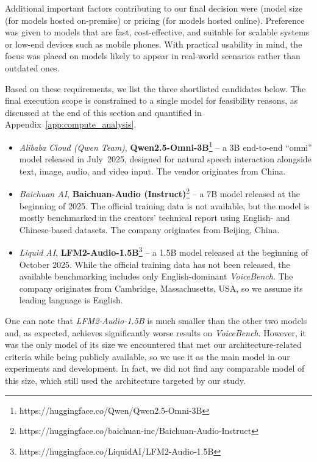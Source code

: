 Additional important factors contributing to our final decision were (model size (for models hosted on-premise) or pricing (for models hosted online). Preference was given to models that are fast, cost-effective, and suitable for scalable systems or low-end devices such as mobile phones. With practical usability in mind, the focus was placed on models likely to appear in real-world scenarios rather than outdated ones.

Based on these requirements, we list the three shortlisted candidates below. The final execution scope is constrained to a single model for feasibility reasons, as discussed at the end of this section and quantified in Appendix~\ref{app:compute_analysis}.

\begin{itemize}

    \item \textit{Alibaba Cloud (Qwen Team)}, \textbf{Qwen2.5-Omni-3B}\footnote{https://huggingface.co/Qwen/Qwen2.5-Omni-3B} \parencite{xu2025qwen25omnitechnicalreport} -- a 3B end-to-end ``omni'' model released in July~2025, designed for natural speech interaction alongside text, image, audio, and video input. The vendor originates from China.

    \item \textit{Baichuan AI}, \textbf{Baichuan-Audio (Instruct)}\footnote{https://huggingface.co/baichuan-inc/Baichuan-Audio-Instruct} \parencite{li2025baichuan} -- a 7B model released at the beginning of 2025. The official training data is not available, but the model is mostly benchmarked in the creators' technical report using English- and Chinese-based datasets. The company originates from Beijing, China.

    \item \textit{Liquid AI}, \textbf{LFM2-Audio-1.5B}\footnote{https://huggingface.co/LiquidAI/LFM2-Audio-1.5B} \parencite{LIQUID_LFM2_AUDIO_2025} -- a 1.5B model released at the beginning of October 2025. While the official training data has not been released, the available benchmarking includes only English-dominant \textit{VoiceBench}. The company originates from Cambridge, Massachusetts, USA, so we assume its leading language is English.

\end{itemize}

\noindent One can note that \textit{LFM2-Audio-1.5B} is much smaller than the other two models and, as expected, achieves significantly worse results on \textit{VoiceBench}. However, it was the only model of its size we encountered that met our architecture-related criteria while being publicly available, so we use it as the main model in our experiments and development. In fact, we did not find any comparable model of this size, which still used the architecture targeted by our study.

